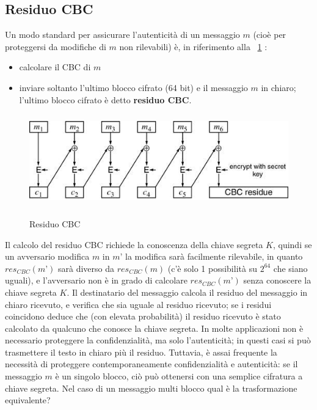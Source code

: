 \subsection{Residuo CBC}
Un modo standard per assicurare l'autenticità di un messaggio $m$ (cioè per proteggersi da modifiche di $m$ non rilevabili) è, in riferimento alla \figurename~\ref{fig:residuo_CBC} :
\begin{itemize}
\item calcolare il CBC di $m$
\item inviare soltanto l'ultimo blocco cifrato (64 bit) e il messaggio $m$ in chiaro; l'ultimo blocco cifrato è detto \textbf{residuo CBC}.
\end{itemize}
\begin{figure}[htbp]
	\centering%
	\subfigure%
	{\includegraphics[height=4cm, width=12cm, keepaspectratio]{Immagini/modalita_operative/residuo_CBC.png}}
	\caption{Residuo CBC \label{fig:residuo_CBC}} 	
\end{figure}
Il calcolo del residuo CBC richiede la conoscenza della chiave segreta $K$, quindi se un avversario modifica $m$ in $m’$ la modifica sarà facilmente rilevabile, in quanto $res_{CBC}(m’)$ sarà diverso da $res_{CBC}(m)$ (c'è solo 1 possibilità su $2^{64}$ che siano uguali), e l'avversario non è in grado di calcolare $res_{CBC}(m’)$ senza conoscere la chiave segreta $K$. 
\newline \newline
Il destinatario del messaggio calcola il residuo del messaggio in chiaro ricevuto, e verifica che sia uguale al residuo ricevuto; se i residui coincidono deduce che (con elevata probabilità) il residuo ricevuto è stato calcolato da qualcuno che conosce la chiave segreta.
\newline \newline
In molte applicazioni non è necessario proteggere la confidenzialità, ma solo l'autenticità; in questi casi si può trasmettere il testo in chiaro più il residuo. Tuttavia, è assai frequente la necessità di
proteggere contemporaneamente confidenzialità e autenticità: se il messaggio $m$ è un singolo blocco, ciò può ottenersi con una semplice cifratura a chiave segreta. Nel caso di un messaggio multi blocco qual è la
trasformazione equivalente?
